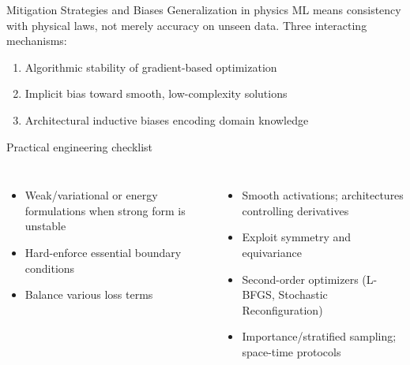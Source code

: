 \documentclass[aspectratio=169,10pt]{beamer}
\begin{document}
\begin{frame}{Mitigation Strategies and Biases}
  Generalization in physics ML means \alert{consistency with physical laws},
  not merely accuracy on unseen data. Three interacting mechanisms:
  \begin{enumerate}
    \item Algorithmic stability of gradient-based optimization
    \item Implicit bias toward smooth, low-complexity solutions
    \item Architectural inductive biases encoding domain knowledge
  \end{enumerate}

  \vspace{0.3cm}
  \begin{block}{Practical engineering checklist}
    \small
    \begin{columns}[T]
        \begin{itemize}
          \item Weak/variational or energy formulations when strong form
                is unstable
          \item Hard-enforce essential boundary conditions
          \item Balance various loss terms
        \end{itemize}
        \begin{itemize}
          \item Smooth activations; architectures controlling derivatives
          \item Exploit symmetry and equivariance
          \item Second-order optimizers (L-BFGS, Stochastic Reconfiguration)
          \item Importance/stratified sampling; space-time protocols
        \end{itemize}
    \end{columns}
  \end{block}
\end{frame}
\end{document}
